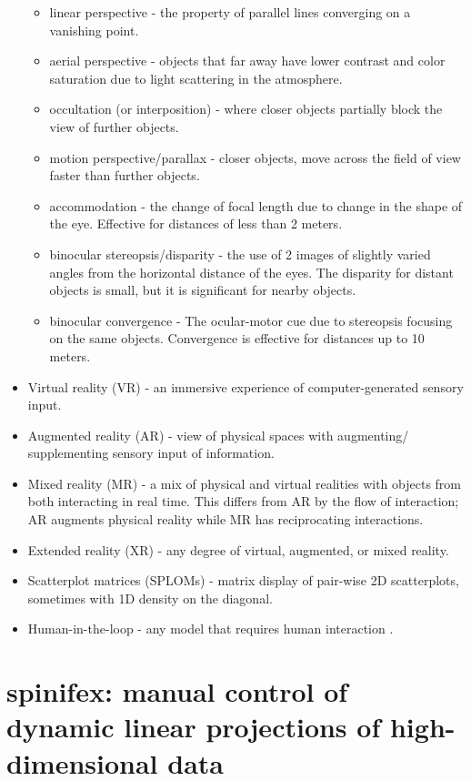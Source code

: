 \documentclass{monashthesis}
\begin{document}
\begin{itemize}
  \begin{itemize}
  \tightlist
  \item
    linear perspective - the property of parallel lines converging on a vanishing point.
  \item
    aerial perspective - objects that far away have lower contrast and color saturation due to light scattering in the atmosphere.
  \item
    occultation (or interposition) - where closer objects partially block the view of further objects.
  \item
    motion perspective/parallax - closer objects, move across the field of view faster than further objects.
  \item
    accommodation - the change of focal length due to change in the shape of the eye. Effective for distances of less than 2 meters.
  \item
    binocular stereopsis/disparity - the use of 2 images of slightly varied angles from the horizontal distance of the eyes. The disparity for distant objects is small, but it is significant for nearby objects.
  \item
    binocular convergence - The ocular-motor cue due to stereopsis focusing on the same objects. Convergence is effective for distances up to 10 meters.
  \end{itemize}
\item
  Virtual reality (VR) - an immersive experience of computer-generated sensory input.
\item
  Augmented reality (AR) - view of physical spaces with augmenting/ supplementing sensory input of information.
\item
  Mixed reality (MR) - a mix of physical and virtual realities with objects from both interacting in real time. This differs from AR by the flow of interaction; AR augments physical reality while MR has reciprocating interactions.
\item
  Extended reality (XR) - any degree of virtual, augmented, or mixed reality.
\item
  Scatterplot matrices (SPLOMs) - matrix display of pair-wise 2D scatterplots, sometimes with 1D density on the diagonal.
\item
  Human-in-the-loop - any model that requires human interaction \autocite{karwowski_international_2006}.
\end{itemize}

\hypertarget{spinifex-manual-control-of-dynamic-linear-projections-of-high-dimensional-data}{%
\chapter{spinifex: manual control of dynamic linear projections of high-dimensional data}\label{spinifex-manual-control-of-dynamic-linear-projections-of-high-dimensional-data}}
\end{document}

